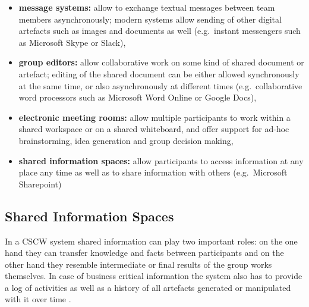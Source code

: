 \begin{itemize}
  \item \textbf{message systems:} allow to exchange textual messages between team members asynchronously; modern systems allow sending of other digital artefacts such as images and documents as well (e.g.\ instant messengers such as Microsoft Skype or Slack),
  \item \textbf{group editors:} allow collaborative work on some kind of shared document or artefact; editing of the shared document can be either allowed synchronously at the same time, or also asynchronously at different times (e.g.\ collaborative word processors such as Microsoft Word Online or Google Docs),
  \item \textbf{electronic meeting rooms:} allow multiple participants to work within a shared workspace or on a shared whiteboard, and offer support for ad-hoc brainstorming, idea generation and group decision making,
  \item \textbf{shared information spaces:} allow participants to access information at any place any time as well as to share information with others (e.g.\ Microsoft Sharepoint)
\end{itemize}


\subsection{Shared Information Spaces}
\label{sec:cscw_shared_spaces}

In a \gls{CSCW} system shared information can play two important roles: on the one hand they can transfer knowledge and facts between participants and on the other hand they resemble intermediate or final results of the group works themselves. In case of business critical information the system also has to provide a log of activities as well as a history of all artefacts generated or manipulated with it over time \citep[pg. 295]{borghoff2000computer}. \\

